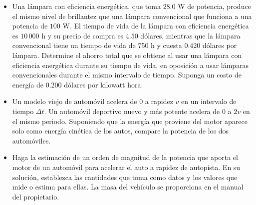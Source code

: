 \documentclass[11pt,a4paper]{article}
\begin{document}
\begin{itemize}
    \item[\textbf{17.}] Una lámpara con eficiencia energética, que toma $28.0 \text{ W}$ de potencia, produce el mismo nivel de brillantez que una lámpara convencional que funciona a una potencia de $100 \text{ W}$. El tiempo de vida de la lámpara con eficiencia energética es $10\,000 \text{ h}$ y su precio de compra es $4.50$ dólares, mientras que la lámpara convencional tiene un tiempo de vida de $750 \text{ h}$ y cuesta $0.420$ dólares por lámpara. Determine el ahorro total que se obtiene al usar una lámpara con eficiencia energética durante su tiempo de vida, en oposición a usar lámparas convencionales durante el mismo intervalo de tiempo. Suponga un costo de energía de $0.200$ dólares por kilowatt hora.
    \vspace*{7cm}

    \item[\textbf{18.}] Un modelo viejo de automóvil acelera de $0$ a rapidez $v$ en un intervalo de tiempo $\Delta t$. Un automóvil deportivo nuevo y más potente acelera de $0$ a $2v$ en el mismo periodo. Suponiendo que la energía que proviene del motor aparece solo como energía cinética de los autos, compare la potencia de los dos automóviles.
    \vspace*{6cm}

    \item[\textbf{19.}] Haga la estimación de un orden de magnitud de la potencia que aporta el motor de un automóvil para acelerar el auto a rapidez de autopista. En su solución, establezca las cantidades que toma como datos y los valores que mide o estima para ellas. La masa del vehículo se proporciona en el manual del propietario.
    \vspace*{6cm}


\end{itemize}
\end{document}

